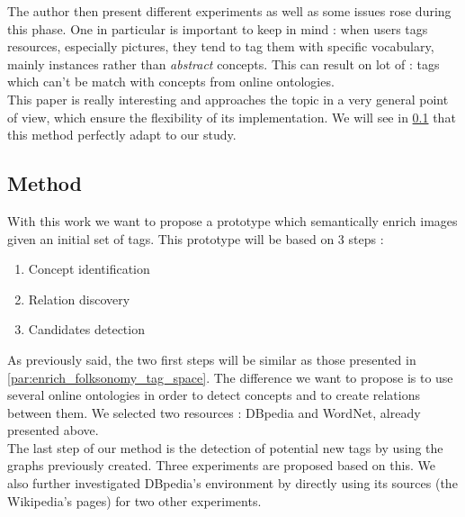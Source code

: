 The author then present different experiments as well as some issues rose during this phase. One in particular is important to keep in mind : when users tags resources, especially pictures, they tend to tag them with specific vocabulary, mainly instances rather than \emph{abstract} concepts. This can result on lot of  : tags which can't be match with concepts from online ontologies.\\

This paper is really interesting and approaches the topic in a very general point of view, which ensure the flexibility of its implementation. We will see in \ref{sub:method} that this method perfectly adapt to our study. 

\subsection{Method} %
\label{sub:method}
With this work we want to propose a prototype which semantically enrich images given an initial set of tags. This prototype will be based on 3 steps :
\begin{enumerate}
	\item Concept identification
	\item Relation discovery
	\item Candidates detection
\end{enumerate}
As previously said, the two first steps will be similar as those presented in \ref{par:enrich_folksonomy_tag_space}. The difference we want to propose is to use several online ontologies in order to detect concepts and to create relations between them. We selected two resources : DBpedia and WordNet, already presented above.\\
The last step of our method is the detection of potential new tags by using the graphs previously created. Three experiments are proposed based on this. We also further investigated DBpedia's environment by directly using its sources (the Wikipedia's pages) for two other experiments.
